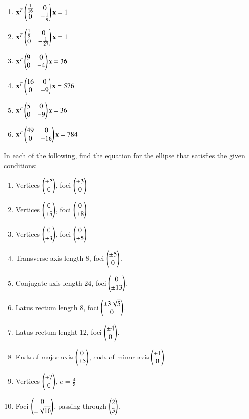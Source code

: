 \begin{enumerate}
\item 
$
\mathbf{x}^T\begin{pmatrix}\frac{1}{16} & 0 \\ 0 & -\frac{1}{9}\end{pmatrix}\mathbf{x} = 1
$
\item 
$
\mathbf{x}^T\begin{pmatrix}\frac{1}{9} & 0 \\ 0 & -\frac{1}{27}\end{pmatrix}\mathbf{x} = 1
$
%
\item 
$
\mathbf{x}^T\begin{pmatrix}9 & 0 \\ 0 & -4\end{pmatrix}\mathbf{x} = 36
$
%
\item 
$
\mathbf{x}^T\begin{pmatrix}16 & 0 \\ 0 & -9\end{pmatrix}\mathbf{x} = 576
$
%
\item 
$
\mathbf{x}^T\begin{pmatrix}5 & 0 \\ 0 & -9\end{pmatrix}\mathbf{x} = 36
$
\item 
$
\mathbf{x}^T\begin{pmatrix}49 & 0 \\ 0 & -16\end{pmatrix}\mathbf{x} = 784
$
%
%
\end{enumerate}
\item In each of the following, find the equation for the ellipse that satisfies the given conditions:
%
\begin{enumerate}
\item Vertices $\begin{pmatrix}\pm 2\\ 0\end{pmatrix}$, foci $\begin{pmatrix}\pm 3\\ 0\end{pmatrix}$ 
\item  Vertices $\begin{pmatrix}0\\ \pm 5\end{pmatrix}$, foci $\begin{pmatrix}0\\ \pm 8\end{pmatrix}$ 
\item  Vertices $\begin{pmatrix} 0\\ \pm 3\end{pmatrix}$, foci $\begin{pmatrix}0 \\\pm 5\end{pmatrix}$ 
\item  Transverse axis length 8, foci $\begin{pmatrix}\pm 5\\ 0\end{pmatrix}$.
\item  Conjugate axis length 24, foci $\begin{pmatrix}0 \\ \pm 13\end{pmatrix}$.
\item  Latus rectum  length 8, foci $\begin{pmatrix} \pm 3\sqrt{5} \\ 0\end{pmatrix}$.
\item  Latus rectum  lenght 12, foci $\begin{pmatrix} \pm 4 \\ 0\end{pmatrix}$.
\item  Ends of major axis $\begin{pmatrix}0\\ \pm 5 \end{pmatrix}$, ends of minor axis $\begin{pmatrix}\pm 1\\ 0\end{pmatrix}$ 
\item  Vertices $\begin{pmatrix}  \pm 7 \\ 0\end{pmatrix}$, $e = \frac{4}{3}$
\item  Foci $\begin{pmatrix} 0\\  \pm \sqrt{10}\end{pmatrix}$, passing through $\begin{pmatrix}2\\3\end{pmatrix}$.

\end{enumerate}

